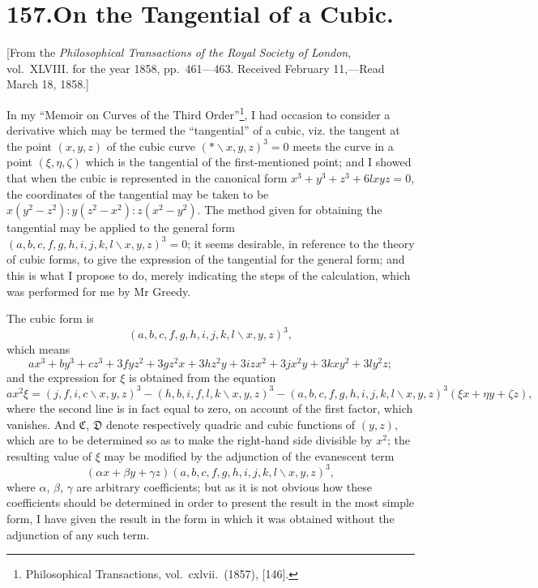 \documentclass[11pt,a4paper]{article}
\begin{document}

\section*{157.\quad On the Tangential of a Cubic.}

\begin{flushleft}
\small
[From the \textit{Philosophical Transactions of the Royal Society of London}, vol.~XLVIII.
for the year 1858, pp.~461---463. Received February 11,---Read March 18, 1858.]
\end{flushleft}

In my ``Memoir on Curves of the Third Order''\footnote{Philosophical Transactions, vol.~cxlvii.~(1857), [146].}, I had occasion to consider a
derivative which may be termed the ``tangential'' of a cubic, viz. the tangent at
the point $(x, y, z)$ of the cubic curve $(\ast\!\backslash x, y, z)^3 = 0$ meets the curve in a point
$(\xi, \eta, \zeta)$ which is the tangential of the first-mentioned point; and I showed that when
the cubic is represented in the canonical form $x^3+y^3+z^3+6lxyz=0$, the coordinates of
the tangential may be taken to be $x(y^2-z^2) : y(z^2-x^2) : z(x^2-y^2)$. The method given for
obtaining the tangential may be applied to the general form $(a,b,c,f,g,h,i,j,k,l\!\backslash x,y,z)^3=0$;
it seems desirable, in reference to the theory of cubic forms, to give the expression of
the tangential for the general form; and this is what I propose to do, merely indicating
the steps of the calculation, which was performed for me by Mr Greedy.

The cubic form is
\[
(a,b,c,f,g,h,i,j,k,l\!\backslash x,y,z)^3,
\]
which means
\[
ax^3+by^3+cz^3+3fyz^2+3gz^2x+3hz^2y+3izx^2+3jx^2y+3kxy^2+3ly^2z;
\]
and the expression for $\xi$ is obtained from the equation
\[
a x^2 \xi = (j,f,i,c\!\backslash x,y,z)^3 - (h,b,i,f,l,k\!\backslash x,y,z)^3 -(a,b,c,f,g,h,i,j,k,l\!\backslash x,y,z)^3 (\xi x+\eta y+\zeta z),
\]
where the second line is in fact equal to zero, on account of the first factor, which
vanishes. And $\mathfrak{C}$, $\mathfrak{D}$ denote respectively quadric and cubic functions of $(y, z)$, which
are to be determined so as to make the right-hand side divisible by $x^2$; the resulting
value of $\xi$ may be modified by the adjunction of the evanescent term
\[
(\alpha x+\beta y+\gamma z)(a,b,c,f,g,h,i,j,k,l\!\backslash x,y,z)^3,
\]
where $\alpha$, $\beta$, $\gamma$ are arbitrary coefficients; but as it is not obvious how these coefficients
should be determined in order to present the result in the most simple form, I have
given the result in the form in which it was obtained without the adjunction of any
such term.
\end{document}
